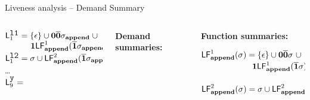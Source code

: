 \begin{frame}{Liveness analysis -- Demand Summary}
\begin{columns}[c]
\begin{column}[T]{0.40\textwidth}
\bigskip

$\Lanv{1}{\lista} = \{\epsilon\} \cup  \acar\bcar\sigma_\append\; \cup $\\
$\;\;\;\;\;\;\;\;\;\;\;\acdr\Lf{\append}{1}{\bcdr\sigma_{\append}}$\\
$\Lanv{1}{\listb} = \sigma \cup \Lf{\append}{2}{\bcdr\sigma_{\append}}$\\
\ldots\\
$\Lanv{9}{\py}  = $  \\


 \end{column}
 \begin{column}[T]{0.30\textwidth}
\scriptsize
\centerline{\bf Demand summaries:}
 \end{column}
 \begin{column}[T]{0.38\textwidth}
\scriptsize
\centerline{\bf Function summaries:}
\bigskip
$\Lf{\append}{1}{\sigma} = \{\epsilon\} \cup \acar\bcar\sigma ~
\cup$ \\ 
$ \;\;\;\;\;\;\;\;\;\;\;\;\;\;\;\;\;\;\;\;\;\;\acdr\Lf{\append}{1}{\bcdr\sigma}$\\ \ \\
$\Lf{\append}{2}{\sigma} = \sigma \cup \Lf{\append}{2}{\bcdr\sigma}$
 \end{column}
\end{columns}
\end{frame}



